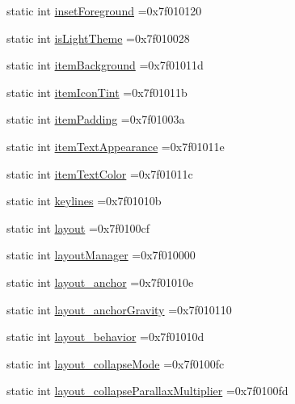 \begin{DoxyCompactItemize}
static int \hyperlink{classandroid_1_1support_1_1design_1_1R_1_1attr_aab326e4395fb0655ef08dc1f6502462b}{inset\+Foreground} =0x7f010120
\item 
static int \hyperlink{classandroid_1_1support_1_1design_1_1R_1_1attr_a2a6cc275e16983cd04955a6776ca5cd6}{is\+Light\+Theme} =0x7f010028
\item 
static int \hyperlink{classandroid_1_1support_1_1design_1_1R_1_1attr_a175ad4ea5ea9131efdf6e243d576e059}{item\+Background} =0x7f01011d
\item 
static int \hyperlink{classandroid_1_1support_1_1design_1_1R_1_1attr_a7020010c833f10c1e8fdba0f874a350f}{item\+Icon\+Tint} =0x7f01011b
\item 
static int \hyperlink{classandroid_1_1support_1_1design_1_1R_1_1attr_af0fdea6a270ce35a04d199699e87cacb}{item\+Padding} =0x7f01003a
\item 
static int \hyperlink{classandroid_1_1support_1_1design_1_1R_1_1attr_a6cb807da22881ce46c383a4b700f7f0e}{item\+Text\+Appearance} =0x7f01011e
\item 
static int \hyperlink{classandroid_1_1support_1_1design_1_1R_1_1attr_ae84392b543d3266d75d0a138ae68d544}{item\+Text\+Color} =0x7f01011c
\item 
static int \hyperlink{classandroid_1_1support_1_1design_1_1R_1_1attr_ad44515d4a3d12b3ce358ed5901dd4590}{keylines} =0x7f01010b
\item 
static int \hyperlink{classandroid_1_1support_1_1design_1_1R_1_1attr_a88b4b57756f226e933f01f855538b081}{layout} =0x7f0100cf
\item 
static int \hyperlink{classandroid_1_1support_1_1design_1_1R_1_1attr_aee29483605d29525a26ab9121d9b7225}{layout\+Manager} =0x7f010000
\item 
static int \hyperlink{classandroid_1_1support_1_1design_1_1R_1_1attr_a5491885998551f44c471758e2f47a6ea}{layout\+\_\+anchor} =0x7f01010e
\item 
static int \hyperlink{classandroid_1_1support_1_1design_1_1R_1_1attr_a04fb1ebb304aea3c387eb9ad4978be39}{layout\+\_\+anchor\+Gravity} =0x7f010110
\item 
static int \hyperlink{classandroid_1_1support_1_1design_1_1R_1_1attr_a807030d508a6ab7e9217a012836ab5f1}{layout\+\_\+behavior} =0x7f01010d
\item 
static int \hyperlink{classandroid_1_1support_1_1design_1_1R_1_1attr_a7e6eee09bb81ae400b00405494ef8eba}{layout\+\_\+collapse\+Mode} =0x7f0100fc
\item 
static int \hyperlink{classandroid_1_1support_1_1design_1_1R_1_1attr_ae85e2416514fea66a3b15a31f8c6ec9c}{layout\+\_\+collapse\+Parallax\+Multiplier} =0x7f0100fd

\end{DoxyCompactItemize}
